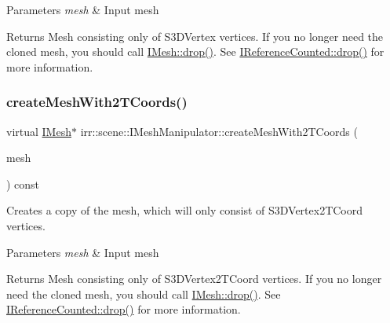 \begin{DoxyParams}{Parameters}
{\em mesh} & Input mesh \\
\hline
\end{DoxyParams}
\begin{DoxyReturn}{Returns}
Mesh consisting only of S3\+D\+Vertex vertices. If you no longer need the cloned mesh, you should call \hyperlink{classirr_1_1IReferenceCounted_a03856a09355b89d178090c4a5f738543}{I\+Mesh\+::drop()}. See \hyperlink{classirr_1_1IReferenceCounted_a03856a09355b89d178090c4a5f738543}{I\+Reference\+Counted\+::drop()} for more information. 
\end{DoxyReturn}
\mbox{\label{classirr_1_1scene_1_1IMeshManipulator_abf123f6fece99816be402e1edf70dc13}} 
\subsubsection{\texorpdfstring{create\+Mesh\+With2\+T\+Coords()}{createMeshWith2TCoords()}}
{\footnotesize\ttfamily virtual \hyperlink{classirr_1_1scene_1_1IMesh}{I\+Mesh}$\ast$ irr\+::scene\+::\+I\+Mesh\+Manipulator\+::create\+Mesh\+With2\+T\+Coords (\begin{DoxyParamCaption}\item[{\hyperlink{classirr_1_1scene_1_1IMesh}{I\+Mesh} $\ast$}]{mesh }\end{DoxyParamCaption}) const\hspace{0.3cm}{\ttfamily [pure virtual]}}



Creates a copy of the mesh, which will only consist of S3\+D\+Vertex2\+T\+Coord vertices. 


\begin{DoxyParams}{Parameters}
{\em mesh} & Input mesh \\
\hline
\end{DoxyParams}
\begin{DoxyReturn}{Returns}
Mesh consisting only of S3\+D\+Vertex2\+T\+Coord vertices. If you no longer need the cloned mesh, you should call \hyperlink{classirr_1_1IReferenceCounted_a03856a09355b89d178090c4a5f738543}{I\+Mesh\+::drop()}. See \hyperlink{classirr_1_1IReferenceCounted_a03856a09355b89d178090c4a5f738543}{I\+Reference\+Counted\+::drop()} for more information. 
\end{DoxyReturn}
\mbox{\label{classirr_1_1scene_1_1IMeshManipulator_ab849bd2c83b206de1e5da19ce3481e35}} 
